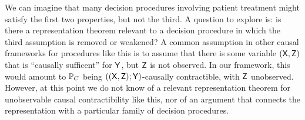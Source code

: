 We can imagine that many decision procedures involving patient treatment might satisfy the first two properties, but not the third. A question to explore is: is there a representation theorem relevant to a decision procedure in which the third assumption is removed or weakened? A common assumption in other causal frameworks for procedures like this is to assume that there is some variable $(\mathsf{X},\mathsf{Z})$ that is ``causally sufficent'' for $\mathsf{Y}$, but $\mathsf{Z}$ is not observed. In our framework, this would amount to $\mathbb{P}_C$ being $((\mathsf{X},\mathsf{Z});\mathsf{Y})$-causally contractible, with $\mathsf{Z}$ unobserved. However, at this point we do not know of a relevant representation theorem for unobservable causal contractibility like this, nor of an argument that connects the representation with a particular family of decision procedures.